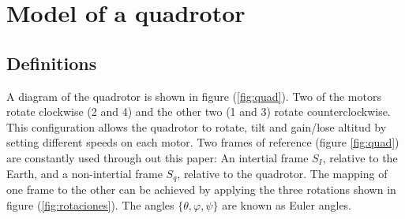 \documentclass[conference]{IEEEtran}
\newcommand{\refp}[1]{(\ref{#1})}
\begin{document}

 

\section{Model of a quadrotor}
\label{sec:modelo}

\subsection{Definitions}
\label{sec:modelo-defs}

A diagram of the quadrotor is shown in figure \refp{fig:quad}. Two of the motors rotate clockwise (2 and 4) and the other two (1 and 3) rotate counterclockwise. This configuration allows the quadrotor to rotate, tilt and gain/lose altitud by setting different speeds on each motor. Two frames of reference (figure \ref{fig:quad}) are constantly used through out this paper: An intertial frame $S_I$, relative to the Earth, and a non-intertial frame $S_q$, relative to the quadrotor. The mapping of one frame to the other can be achieved by applying the three rotations shown in figure \refp{fig:rotaciones}. The angles $\lbrace \theta, \varphi, \psi\rbrace$ are known as Euler angles.
\end{document}
